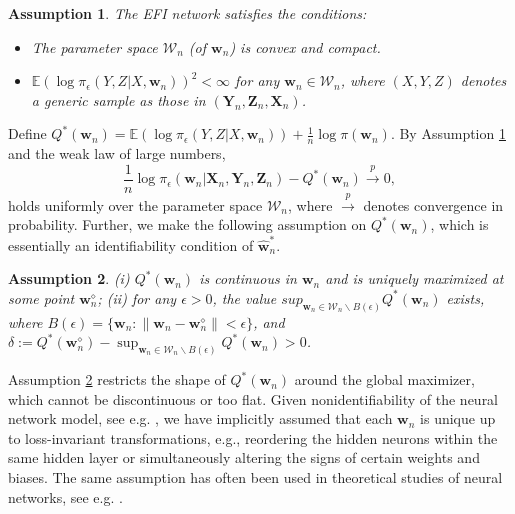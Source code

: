 \documentclass[11pt]{article}
\newcommand{\bX}{{\boldsymbol X}}
\newcommand{\bY}{{\boldsymbol Y}}
\newcommand{\bZ}{{\boldsymbol Z}}
\newcommand{\bw}{{\boldsymbol w}}
\newtheorem{assumption}{Assumption}
\begin{document}
\begin{assumption} \label{ass1} The EFI network satisfies the conditions:
 \begin{itemize}
     \item[(i)] The parameter space $\mathcal{W}_n$ (of $\bw_n$) is convex and compact. 
     \item[(ii)] $\mathbb{E} (\log\pi_{\epsilon}(Y,Z|X,\bw_n))^2 < \infty$ for any $\bw_n\in \mathcal{W}_n$, where $(X,Y,Z)$ denotes a generic sample as those in $(\bY_n,\bZ_n,\bX_n)$.
 \end{itemize}
 \end{assumption} 

 

Define $Q^*(\bw_n)= \mathbb{E}(\log \pi_{\epsilon}(Y,Z|X,\bw_n))+ \frac{1}{n} \log\pi(\bw_n)$.
By Assumption \ref{ass1} and the weak law of large numbers, 
\begin{equation}\label{eq:sameloss2}
    \frac{1}{n}\log\pi_{\epsilon}(\bw_n|\bX_n,\bY_n,\bZ_n)-Q^*(\bw_n)\overset{p}{\rightarrow} 0,
\end{equation}
holds uniformly over the parameter space $\mathcal{W}_n$, where $\stackrel{p}{\to}$ denotes 
convergence in probability. Further, we make the following assumption on $Q^*(\bw_n)$, which is essentially an identifiability condition of $\hat{\bw}_n^*$.

\begin{assumption}\label{ass2}
(i) $Q^*(\bw_n)$ is continuous in $\bw_n$ and is uniquely maximized
at some point $\bw_n^{\diamond}$; %
(ii) for any $\epsilon>0$, the value $sup_{\bw_n\in\mathcal{W}_n \backslash B(\epsilon)}Q^*(\bw_n)$ exists, where $B(\epsilon)=\{\bw_n:\|\bw_n-\bw_n^{\diamond}\|<\epsilon\}$, and $\delta:=Q^*(\bw_n^{\diamond})-\sup_{\bw_n\in\mathcal{W}_n \backslash B(\epsilon)}Q^*(\bw_n)>0$.
\end{assumption}
Assumption \ref{ass2} restricts the shape of $Q^*(\bw_n)$ around the global maximizer, which cannot be discontinuous or too flat.  
Given nonidentifiability of the neural network model, see e.g. \cite{SunSLiang2021}, we have implicitly assumed that each $\bw_n$  is unique up to loss-invariant transformations, e.g., reordering the hidden neurons within the same hidden layer or simultaneously altering the signs of certain weights and biases. The same assumption has often been used in theoretical studies of neural networks, see e.g. \cite{Liang2018BNN}.
\end{document}

